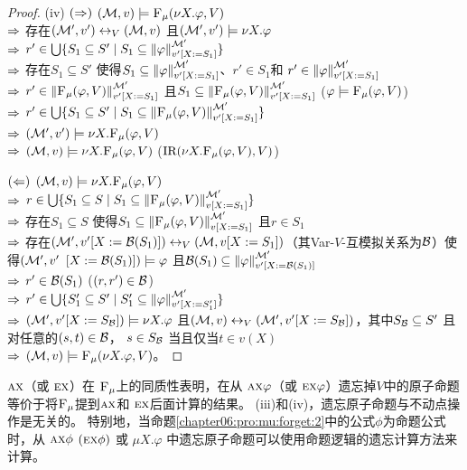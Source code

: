 \begin{proof}
	(iv) $(\Rightarrow)$ $({\cal M},v) \models {\textsc{F}_{\textsc{$\mu$}}}(\nu X. \varphi, V)$\\
	$\Rightarrow$ 存在$({\cal M}', v') \leftrightarrow_V ({\cal M},v)$ 且$({\cal M}',v') \models \nu X. \varphi$\\
	$\Rightarrow$ $r' \in \bigcup \{S_1 \subseteq S' \mid S_1 \subseteq \left\|\varphi\right\|_{v'[X:=S_1]}^{{\cal M}'}\}$\\
	$\Rightarrow$ 存在$S_1 \subseteq S'$ 使得$S_1 \subseteq \left\|\varphi\right\|_{v'[X:=S_1]}^{{\cal M}'}$、$r'\in S_1$和 $r'\in \left\|\varphi\right\|_{v'[X:=S_1]}^{{\cal M}'}$\\
	$\Rightarrow$ $r' \in \left\|{\textsc{F}_{\textsc{$\mu$}}}(\varphi,V)\right\|_{v'[X:=S_1]}^{{\cal M}'}$ 且$S_1 \subseteq \left\|{\textsc{F}_{\textsc{$\mu$}}}(\varphi,V)\right\|_{v'[X:=S_1]}^{{\cal M}'}$ \hfill ($\varphi \models {\textsc{F}_{\textsc{$\mu$}}}(\varphi,V)$)\\
	$\Rightarrow$ $r'\in \bigcup \{S_1 \subseteq S' \mid S_1 \subseteq \left\|{\textsc{F}_{\textsc{$\mu$}}}(\varphi,V)\right\|_{v'[X:=S_1]}^{{\cal M}'}\}$\\
	$\Rightarrow$ $({\cal M}',v')\models \nu X. {\textsc{F}_{\textsc{$\mu$}}}(\varphi,V)$\\
	$\Rightarrow$ $({\cal M},v) \models \nu X. {\textsc{F}_{\textsc{$\mu$}}}(\varphi,V)$ \hfill  ($\textrm{IR}(\nu X. {\textsc{F}_{\textsc{$\mu$}}}(\varphi,V), V)$)
	
	$(\Leftarrow)$ $({\cal M},v)\models \nu X. {\textsc{F}_{\textsc{$\mu$}}}(\varphi,V)$\\
	$\Rightarrow$ $r\in \bigcup \{S_1 \subseteq S \mid S_1 \subseteq \left\|{\textsc{F}_{\textsc{$\mu$}}}(\varphi,V)\right\|_{v[X:=S_1]}^{{\cal M}'}\}$\\
	$\Rightarrow$ 存在$S_1 \subseteq S$ 使得$S_1 \subseteq \left\|{\textsc{F}_{\textsc{$\mu$}}}(\varphi,V)\right\|_{v[X:=S_1]}^{{\cal M}'}$ 且$r \in S_1$\\
	$\Rightarrow$ 存在$({\cal M}',v'[X:={\cal B}(S_1)]) \leftrightarrow_V ({\cal M},v[X:=S_1])$（其Var-$V$-互模拟关系为${\cal B}$）使得$({\cal M}',v'$ $[X:={\cal B}(S_1)]) \models \varphi$ 且${\cal B}(S_1) \subseteq \left\|\varphi\right\|_{v'[X:={\cal B}(S_1)]}^{{\cal M}'}$\\
	$\Rightarrow$ $r'\in {\cal B}(S_1)$ \hfill ($(r,r')\in {\cal B}$)\\
	$\Rightarrow$ $r'\in \bigcup \{S_1' \subseteq S' \mid S_1' \subseteq \left\|\varphi\right\|_{v'[X:=S_1']}^{{\cal M}'}\}$\\
	$\Rightarrow$ $({\cal M}',v'[X:=S_{{\cal B}}]) \models \nu X. \varphi$ 且$({\cal M},v) \leftrightarrow_V ({\cal M}',v'[X:=S_{{\cal B}}])$，其中$S_{{\cal B}} \subseteq S'$ 且对任意的$(s,t)\in {\cal B}$， $s\in S_{{\cal B}}$ 当且仅当$t\in v(X)$\\
	$\Rightarrow$ $({\cal M}, v) \models {\textsc{F}_{\textsc{$\mu$}}}(\nu X. \varphi, V)$。
\end{proof}


$\textsc{a}\textsc{x}$（或 $\textsc{e}\textsc{x}$）在 ${\textsc{F}_{\textsc{$\mu$}}}$上的同质性表明，在从 $\textsc{a}\textsc{x} \varphi$（或 $\textsc{e}\textsc{x} \varphi$）遗忘掉$V$中的原子命题等价于将${\textsc{F}_{\textsc{$\mu$}}}$提到$\textsc{a}\textsc{x}$和 $\textsc{e} \textsc{x}$后面计算的结果。
(iii)和(iv)，遗忘原子命题与不动点操作是无关的。
特别地，当命题\ref{chapter06:pro:mu:forget:2}中的公式$\phi$为命题公式时，从
$\textsc{a}\textsc{x} \phi$ $(\textsc{e}\textsc{x} \phi)$ 或 $\mu X. \varphi$ 中遗忘原子命题可以使用命题逻辑的遗忘计算方法来计算。

